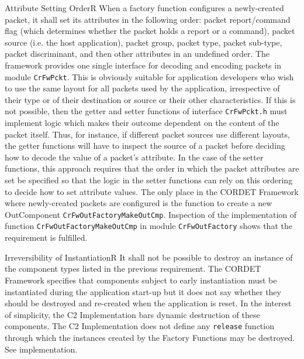 \documentclass[a4paper,10pt]{article}
\newenvironment{fw_req}[6]
{\addtocounter{subsubsection}{1}
	\hspace{0.2cm}\textbf{CR-\arabic{section}.\arabic{subsection}.\arabic{subsubsection}/#2
	\hspace{0.8cm} #1}
	\vspace{-10pt}
\begin{longtable}{p{2.7cm}P{8.5cm}}
\hline
\textsc{Requirement} & #3 \\
\textsc{Justification} & #4 \\
\textsc{Implementation} & #5  \\ 
\textsc{Verification} & #6  \\
\hline
}
{\end{longtable}}
\begin{document}
\begin{fw_req}{Attribute Setting Order}{R}
{When a factory function configures a newly-created packet, it shall set its attributes in the following order: packet report/command flag (which determines whether the packet holds a report or a command), packet source (i.e. the host application), packet group, packet type, packet sub-type, packet discriminant, and then other attributes in an undefined order.}
{The framework provides one single interface for decoding and encoding packets in module \texttt{CrFwPckt}. This is obviously suitable for application developers who wish to use the same layout for all packets used by the application, irrespective of their type or of their destination or source or their other characteristics. If this is not possible, then the getter and setter functions of interface \texttt{CrFwPckt.h} must implement logic which makes their outcome dependent on the content of the packet itself. Thus, for instance, if different packet sources use different layouts, the getter functions will have to inspect the source of a packet before deciding how to decode the value of a packet's attribute. In the case of the setter functions, this approach requires that the order in which the packet attributes are set be specified so that the logic in the setter functions can rely on this ordering to decide how to set attribute values. }
{The only place in the CORDET Framework where newly-created packets are configured is the function to create a new OutComponent \texttt{CrFwOutFactoryMakeOutCmp}.} 
{Inspection of the implementation of function \texttt{CrFwOutFactoryMakeOutCmp} in module \texttt{CrFwOutFactory} shows that the requirement is fulfilled.}
\end{fw_req}


\begin{fw_req}{Irreversibility of Instantiation}{R}
{It shall not be possible to destroy an instance of the component types listed in the previous requirement.}
{The CORDET Framework specifies that components subject to early instantiation must be instantiated during the application start-up but it does not say whether they should be destroyed and re-created when the application is reset. In the interest of simplicity, the C2 Implementation bars dynamic destruction of these components.}
{The C2 Implementation does not define any \texttt{release} function through which the instances created by the Factory Functions may be destroyed. } 
{See implementation.}
\end{fw_req}
\end{document}

